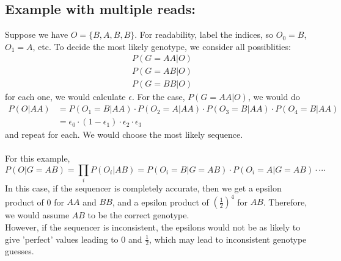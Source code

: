 \documentclass[10pt]{article}
\begin{document}
\subsection*{Example with multiple reads:}
Suppose we have $O = \{B, A, B, B\}$.  For readability, label the indices, so $O_0 = B$, $O_1 = A$, etc.  To decide the most likely genotype, we consider all possiblities:
\begin{align*}
    &P(G = AA \vert O)\\
    &P(G = AB \vert O)\\
    &P(G = BB \vert O)
\end{align*}
for each one, we would calculate $\epsilon$.  For the case, $P(G = AA \vert O)$, we would do
\begin{align*}
    P(O \vert AA) &= P(O_1 = B \vert AA) \cdot P(O_2 = A \vert AA) \cdot P(O_3 = B \vert AA) \cdot P(O_4 = B \vert AA)\\
    &= \epsilon_0 \cdot (1 - \epsilon_1) \cdot \epsilon_2 \cdot \epsilon_3
\end{align*}
and repeat for each.  We would choose the most likely sequence.\\\\
For this example,
\[P(O \vert G = AB) = \prod_i P(O_i \vert AB) = P(O_i = B \vert G = AB) \cdot P(O_i = A \vert G = AB) \cdot \cdots\]
In this case, if the sequencer is completely accurate, then we get a epsilon product of 0 for $AA$ and $BB$, and a epsilon product of $\left(\frac{1}{2}\right)^4$ for $AB$.  Therefore, we would assume $AB$ to be the correct genotype.\\
However, if the sequencer is inconsistent, the epsilons would not be as likely to give 'perfect' values leading to 0 and $\frac{1}{2}$, which may lead to inconsistent genotype guesses.
\end{document}

